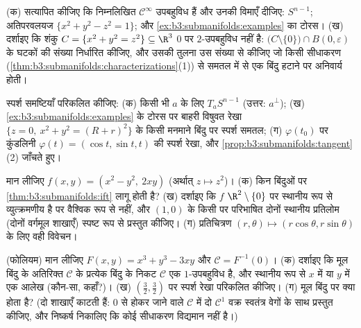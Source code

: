 \begin{exercise}[$\star$]\label{exo:b3:submanifolds:1}
(क) सत्यापित कीजिए कि निम्नलिखित $\mathcal C^\infty$ उपबहुविध हैं और उनकी
विमाएँ दीजिए: $S^{n-1}$; अतिपरवलयज $\{x^2 + y^2 - z^2 = 1\}$; और \cref{ex:b3:submanifolds:examples} का टोरस।
(ख) दर्शाइए कि शंकु $C = \{x^2 + y^2 = z^2\} \subseteq
\R^3$ $0$ पर $2$-उपबहुविध नहीं है:
$\bigl(C\setminus\{0\}\bigr)\cap B(0,\varepsilon)$ के  घटकों की संख्या निर्धारित कीजिए, और उसकी तुलना उस
संख्या से कीजिए जो किसी सीधाकरण (\cref{thm:b3:submanifolds:characterizations}(1)) से समतल में से एक
बिंदु हटाने पर अनिवार्य होती।
\end{exercise}

\begin{exercise}[$\star$]\label{exo:b3:submanifolds:2}
स्पर्श समष्टियाँ परिकलित कीजिए:
(क) किसी भी $a$ के लिए $T_aS^{n-1}$ (उत्तर: $a^\perp$);
(ख) \cref{ex:b3:submanifolds:examples} के टोरस पर बाहरी विषुवत रेखा $\{z = 0,\ x^2 + y^2 = (R + r)^2\}$ के किसी मनमाने
बिंदु पर स्पर्श समतल;
(ग) $\varphi(t_0)$ पर कुंडलिनी $\varphi(t) = (\cos t,
\sin t, t)$ की स्पर्श रेखा, और \cref{prop:b3:submanifolds:tangent}(2) जाँचते
हुए।
\end{exercise}

\begin{exercise}[$\star\star$]\label{exo:b3:submanifolds:3}
मान लीजिए $f(x, y) = (x^2 - y^2,\ 2xy)$ (अर्थात् $z \mapsto z^2$)।
(क) किन बिंदुओं पर \cref{thm:b3:submanifolds:ift} लागू होती है?
(ख) दर्शाइए कि $f$ $\R^2\setminus\{0\}$ पर स्थानीय रूप से व्युत्क्रमणीय है पर
वैश्विक रूप से नहीं, और $(1, 0)$ के किसी  पर परिभाषित दोनों
स्थानीय प्रतिलोम (दोनों वर्गमूल शाखाएँ) स्पष्ट रूप से प्रस्तुत
कीजिए।
(ग)  प्रतिचित्रण $(r,
\theta) \mapsto (r\cos\theta, r\sin\theta)$ के लिए वही विवेचन।
\end{exercise}

\begin{exercise}[$\star\star$]\label{exo:b3:submanifolds:4}
(फोलियम) मान लीजिए $F(x,y) = x^3 + y^3 - 3xy$ और $\mathcal C =
F^{-1}(0)$।
(क) दर्शाइए कि मूल बिंदु के अतिरिक्त $\mathcal C$ के प्रत्येक बिंदु के
निकट $\mathcal C$ एक $1$-उपबहुविध है, और स्थानीय रूप से $x$ में या
$y$ में एक आलेख (कौन-सा, कहाँ?)।
(ख) $(\frac32, \frac32)$ पर स्पर्श रेखा परिकलित कीजिए।
(ग) मूल बिंदु पर क्या होता है? (दो शाखाएँ काटती हैं: $0$ से
होकर जाने वाले $\mathcal C$ में दो $\mathcal C^1$ वक्र स्वतंत्र वेगों के साथ
प्रस्तुत कीजिए, और निष्कर्ष निकालिए कि कोई सीधाकरण विद्यमान नहीं
है।)
\end{exercise}


